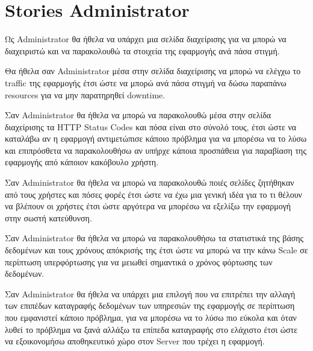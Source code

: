 \section{Stories Administrator}

\begin{tcolorbox}[colback=fg!10!white,colframe=abg!100!white,
	title=1η ιστορία]
Ως Administrator θα ήθελα να υπάρχει μια σελίδα διαχείρισης για να μπορώ να διαχειριστώ και να παρακολουθώ τα στοιχεία της εφαρμογής ανά πάσα στιγμή.
\end{tcolorbox}

\begin{tcolorbox}[colback=fg!10!white,colframe=abg!100!white,
	title=2η ιστορία]
Θα ήθελα σαν Administrator μέσα στην σελίδα διαχείρισης να μπορώ να ελέγχω το traffic της εφαρμογής έτσι ώστε να μπορώ ανά πάσα στιγμή να δώσω παραπάνω resources για να μην παρατηρηθεί downtime.
\end{tcolorbox}

\begin{tcolorbox}[colback=fg!10!white,colframe=abg!100!white,
	title=3η ιστορία]
Σαν Administrator θα ήθελα να μπορώ να παρακολουθώ μέσα στην σελίδα διαχείρισης τα HTTP Status Codes και πόσα είναι στο σύνολό τους, έτσι ώστε να καταλάβω αν η εφαρμογή αντιμετώπισε κάποιο πρόβλημα για να μπορέσω να το λύσω και επιπρόσθετα να παρακολουθήσω αν υπήρχε κάποια προσπάθεια για παραβίαση της εφαρμογής από κάποιον κακόβουλο χρήστη.
\end{tcolorbox}

\begin{tcolorbox}[colback=fg!10!white,colframe=abg!100!white,
	title=4η ιστορία]
Σαν Administrator θα ήθελα να μπορώ να παρακολουθώ ποιές σελίδες ζητήθηκαν από τους χρήστες και πόσες φορές έτσι ώστε να έχω μια γενική ιδέα για το τι θέλουν να βλέπουν οι χρήστες έτσι ώστε αργότερα να μπορέσω να εξελίξω την εφαρμογή στην σωστή κατεύθυνση.
\end{tcolorbox}

\begin{tcolorbox}[colback=fg!10!white,colframe=abg!100!white,
	title=5η ιστορία]
Σαν Administrator θα ήθελα να μπορώ να παρακολουθήσω τα στατιστικά της βάσης δεδομένων και τους χρόνους απόκρισής της έτσι ώστε να μπορώ να την κάνω Scale σε περίπτωση υπερφόρτωσης για να μειωθεί σημαντικά ο χρόνος φόρτωσης των δεδομένων.
\end{tcolorbox}

\begin{tcolorbox}[colback=fg!10!white,colframe=abg!100!white,
	title=6η ιστορία]
Σαν Administrator θα ήθελα να υπάρχει μια επιλογή που να επιτρέπει την αλλαγή των επιπέδων καταγραφής δεδομένων των υπηρεσιών της εφαρμογής σε περίπτωση που εμφανιστεί κάποιο πρόβλημα, για να μπορέσω να το λύσω πιο εύκολα και όταν λυθεί το πρόβλημα να ξανά αλλάξω τα επίπεδα καταγραφής στο ελάχιστο έτσι ώστε να εξοικονομήσω αποθηκευτικό χώρο στον Server που τρέχει η εφαρμογή.
\end{tcolorbox}